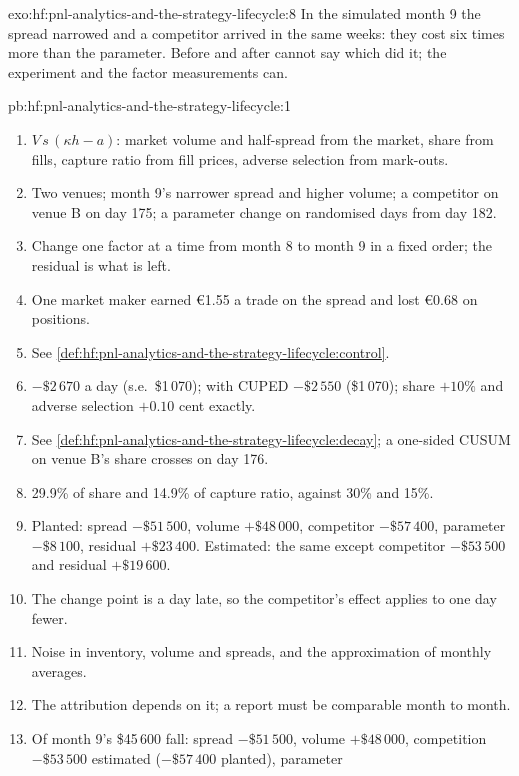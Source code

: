 \begin{solution}{exo:hf:pnl-analytics-and-the-strategy-lifecycle:8}
In the simulated month 9 the spread narrowed and a competitor arrived in the same weeks: they cost six times more than the parameter. Before and
after cannot say which did it; the experiment and the factor measurements can.
\end{solution}

\begin{solution}{pb:hf:pnl-analytics-and-the-strategy-lifecycle:1}
\begin{enumerate}
\item $V\,s\,(\kappa h-a)$: market volume and half-spread from the market, share from fills, capture ratio from fill prices, adverse selection from
mark-outs.
\item Two venues; month 9's narrower spread and higher volume; a competitor on venue B on day 175; a parameter change on randomised days from day 182.
\item Change one factor at a time from month 8 to month 9 in a fixed order; the residual is what is left.
\item One market maker earned \euro1.55 a trade on the spread and lost \euro0.68 on positions.
\item See \cref{def:hf:pnl-analytics-and-the-strategy-lifecycle:control}.
\item $-\$2\,670$ a day (s.e.\ \$1\,070); with CUPED $-\$2\,550$ (\$1\,070); share $+10\%$ and adverse selection $+0.10$ cent exactly.
\item See \cref{def:hf:pnl-analytics-and-the-strategy-lifecycle:decay}; a one-sided CUSUM on venue B's share crosses on day 176.
\item 29.9\% of share and 14.9\% of capture ratio, against 30\% and 15\%.
\item Planted: spread $-\$51\,500$, volume $+\$48\,000$, competitor $-\$57\,400$, parameter $-\$8\,100$, residual $+\$23\,400$. Estimated: the same
except competitor $-\$53\,500$ and residual $+\$19\,600$.
\item The change point is a day late, so the competitor's effect applies to one day fewer.
\item Noise in inventory, volume and spreads, and the approximation of monthly averages.
\item The attribution depends on it; a report must be comparable month to month.
\item Of month 9's \$45\,600 fall: spread $-\$51\,500$, volume $+\$48\,000$, competition $-\$53\,500$ estimated ($-\$57\,400$ planted), parameter

\end{enumerate}
\end{solution}
